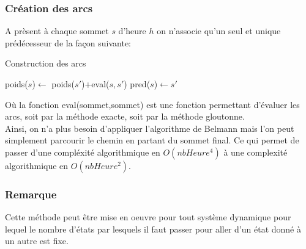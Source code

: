 \documentclass[a4paper]{report}
\begin{document}
\subsubsection*{Création des arcs}
A prèsent à chaque sommet $s$ d'heure $h$ on n'associe qu'un seul et unique prédécesseur de la façon suivante: \\

 \begin{algorithm}[H]
 \caption{Construction des arcs}
 
 
 \begin{algorithmic}


 \STATE poids($s$)$\longleftarrow$ poids($s'$)+eval($s,s'$)
\STATE pred($s$)$\longleftarrow s'$
 \ENDIF

 \ENDFOR
 

 \end{algorithmic}
 \end{algorithm}
Où la fonction eval(sommet,sommet) est une fonction permettant d'évaluer les arcs, soit par la méthode exacte, soit par la méthode gloutonne.\\

Ainsi, on n'a plus besoin d'appliquer l'algorithme de Belmann mais l'on peut simplement parcourir le chemin en partant du sommet final. Ce qui permet de passer d'une compléxité algorithmique en $O(nbHeure^4)$ à une complexité algorithmique en $O(nbHeure^2)$.
\subsubsection*{Remarque}
Cette méthode peut être mise en oeuvre pour tout système dynamique pour lequel le nombre d'états par lesquels il faut passer pour aller d'un état donné à un autre est fixe.
\end{document}
